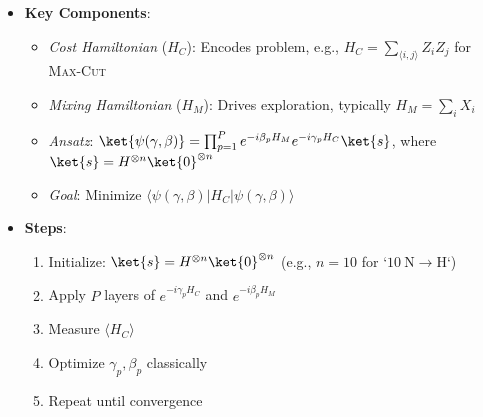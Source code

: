 \begin{multicols}{3}
\begin{itemize}[leftmargin=*,nosep,topsep=0pt]
                    \item \textbf{Key Components}:
                      \begin{itemize}[nosep]
                        \item \textit{Cost Hamiltonian} ($H_C$): Encodes
                          problem, e.g., $H_C = \sum_{\langle i,j \rangle}
                          Z_i Z_j$ for \textsc{Max-Cut}

                        \item \textit{Mixing Hamiltonian} ($H_M$): Drives
                          exploration, typically $H_M = \sum_i X_i$

                        \item \textit{Ansatz}: $\ket{\psi(\gamma, \beta)} =
                          \prod_{p=1}^P e^{-i\beta_p H_M} e^{-i\gamma_p H_C}
                          \ket{s}$, where $\ket{s} = H^{\otimes n}
                          \ket{0}^{\otimes n}$

                        \item \textit{Goal}: Minimize $\langle \psi(\gamma,
                          \beta) | H_C | \psi(\gamma, \beta) \rangle$
                      \end{itemize}

                    \item \textbf{Steps}:
                      \begin{enumerate}[nosep]
                        \item Initialize: $\ket{s} = H^{\otimes n}
                          \ket{0}^{\otimes n}$ (e.g., $n=10$ for `$10
                          \mathrm{~N} \rightarrow \mathrm{H}$`)

                        \item Apply $P$ layers of $e^{-i\gamma_p H_C}$ and
                          $e^{-i\beta_p H_M}$

                        \item Measure $\langle H_C \rangle$

                        \item Optimize $\gamma_p, \beta_p$ classically

                        \item Repeat until convergence
                      \end{enumerate}


\end{itemize}
\end{multicols}
